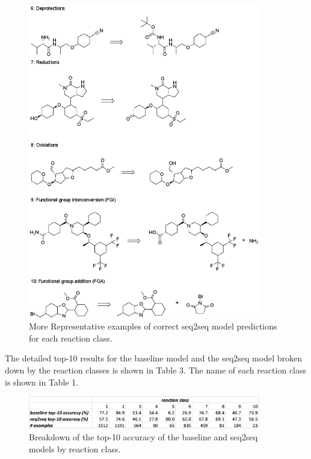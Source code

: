 \begin{figure}
  \centering
  \includegraphics[width=0.9\textwidth]{Images/ret_seq2seq_correct_part_2.png}
  \caption{More Representative examples of correct seq2seq model predictions for each reaction class.}
  \label{fig:ret_table2}
\end{figure}

The detailed top-10 results for the baseline model and the seq2seq model broken down by the reaction classes is shown in Table 3. The name of each reaction class is shown in Table 1.

\begin{figure}
  \centering
  \includegraphics[width=0.9\textwidth]{Images/ret_table_3.png}
  \caption{Breakdown of the top-10 accuracy of the baseline and seq2seq models by reaction class.}
  \label{fig:ret_table2}
\end{figure}

